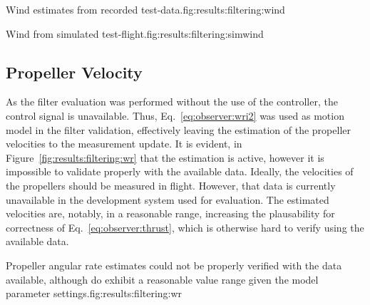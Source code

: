     \begin{subfigures}{Wind estimates from recorded test-data.}{fig:results:filtering:wind}
    \end{subfigures}

    \begin{subfigures}{Wind from simulated test-flight.}{fig:results:filtering:simwind}
    \end{subfigures}


\subsection{Propeller Velocity}
    As the filter evaluation was performed without the use of the controller,
    the control signal is unavailable. Thus, Eq.~\ref{eq:observer:wri2} was used as
    motion model in the filter validation, effectively leaving the estimation of the propeller velocities
    to the measurement update. It is evident, in Figure~\ref{fig:results:filtering:wr}
    that the estimation is active, however it is impossible to validate properly with the available data.
    Ideally, the velocities of the propellers should be measured in flight.
    However, that data is currently unavailable in the development system used for evaluation.
    The estimated velocities are, notably, in a reasonable range,
    increasing the plausability for correctness of Eq.~\ref{eq:observer:thrust}, which is
    otherwise hard to verify using the available data.

    \begin{subfigures}{Propeller angular rate estimates could not be properly verified with the data available, although do exhibit a reasonable value range given the model parameter settings.}{fig:results:filtering:wr}
    \end{subfigures}

